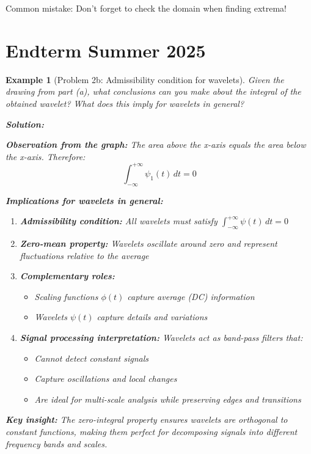 \documentclass[11pt,a4paper]{article}
\newtheorem{example}[theorem]{Example}
\begin{document}
\begin{warning}
    Common mistake: Don't forget to check the domain when finding extrema!
\end{warning}

\section{Endterm Summer 2025}

\begin{example}[Problem 2b: Admissibility condition for wavelets]
   Given the drawing from part (a), what conclusions can you make about the integral of the obtained wavelet? What does this imply for wavelets in general?
   
   \textbf{Solution:}
   
   \textbf{Observation from the graph:} The area above the x-axis equals the area below the x-axis. Therefore:
   $$\int_{-\infty}^{+\infty} \psi_1(t)\,dt = 0$$
   
   \textbf{Implications for wavelets in general:}
   \begin{enumerate}
       \item \textbf{Admissibility condition:} All wavelets must satisfy $\int_{-\infty}^{+\infty} \psi(t)\,dt = 0$
       
       \item \textbf{Zero-mean property:} Wavelets oscillate around zero and represent fluctuations relative to the average
       
       \item \textbf{Complementary roles:}
       \begin{itemize}
           \item Scaling functions $\phi(t)$ capture average (DC) information
           \item Wavelets $\psi(t)$ capture details and variations
       \end{itemize}
       
       \item \textbf{Signal processing interpretation:} Wavelets act as band-pass filters that:
       \begin{itemize}
           \item Cannot detect constant signals
           \item Capture oscillations and local changes
           \item Are ideal for multi-scale analysis while preserving edges and transitions
       \end{itemize}
   \end{enumerate}
   
   \textbf{Key insight:} The zero-integral property ensures wavelets are orthogonal to constant functions, making them perfect for decomposing signals into different frequency bands and scales.
\end{example}
\end{document}
